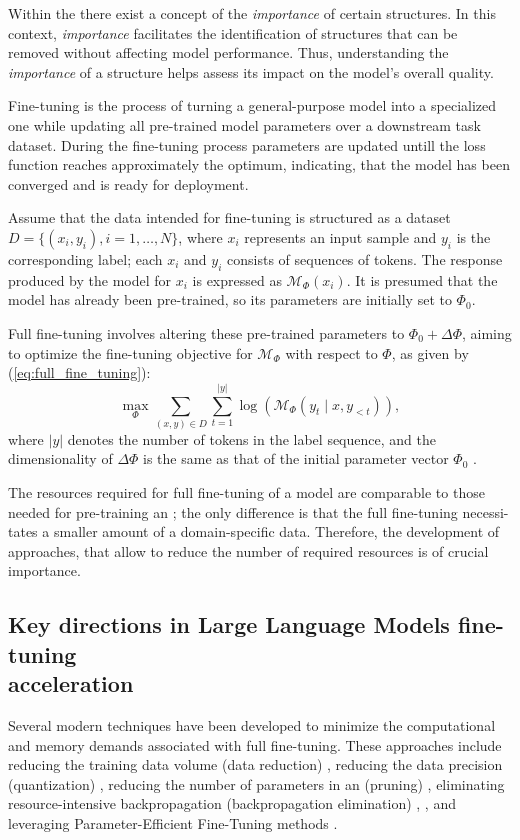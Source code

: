     Within the \llm{} there exist a concept of the  \textit{importance} of certain structures. In this context, \textit{importance} facilitates the identification of structures that can be removed without affecting model performance. Thus, understanding the \textit{importance} of a structure helps assess its impact on the model's overall quality.

    Fine-tuning is the process of turning a general-purpose model into a specialized one while updating all pre-trained model parameters over a downstream task dataset. During the fine-tuning process \llm{} parameters are updated untill the loss function reaches approximately the optimum, indicating, that the model has been converged \cite{allenzhu2019convergencetheorydeeplearning} and is ready for deployment. 

    Assume that the data intended for fine-tuning is structured as a dataset $D = \{(x_i, y_i), i = 1, \ldots, N\}$, where $x_i$ represents an input sample and $y_i$ is the corresponding label; each $x_i$ and $y_i$ consists of sequences of tokens. The response produced by the model for $x_i$ is expressed as $\mathcal{M}_\Phi(x_i)$. It is presumed that the model has already been pre-trained, so its parameters are initially set to $\Phi_0$.

    Full fine-tuning involves altering these pre-trained parameters to $\Phi_0 + \Delta \Phi$, aiming to optimize the fine-tuning objective for $\mathcal{M}_\Phi$ with respect to $\Phi$, as given by (\ref{eq:full_fine_tuning}):
    \begin{equation}
        \label{eq:full_fine_tuning}
        \max_{\Phi} \sum_{(x, y) \in D} \sum_{t = 1}^{|y|} \log\left(\mathcal{M}_\Phi(y_t \mid x, y_{<t})\right),
    \end{equation}
    where $|y|$ denotes the number of tokens in the label sequence, and the dimensionality of $\Delta \Phi$ is the same as that of the initial parameter vector $\Phi_0$ \cite{lora}.
    
    The resources required for full fine-tuning of a model are comparable to those needed for pre-training an \llm{}; the only difference is that the full fine-tuning necessi-tates a smaller amount of a domain-specific data. Therefore, the development of approaches, that allow to reduce the number of required resources is of crucial importance. 
\subsection{Key directions in Large Language Models fine-tuning \\ acceleration}
    Several modern techniques have been developed to minimize the computational and memory demands associated with full fine-tuning. These approaches include reducing the training data volume (data reduction) \cite{aloe}, reducing the data precision (quantization) \cite{qlora}, reducing the number of parameters in an \llm{} (pruning) \cite{model_pruning}, eliminating resource-intensive backpropagation (backpropagation elimination) \cite{mezo}, \cite{hinton2022forwardforwardalgorithmpreliminaryinvestigations}, and leveraging Parameter-Efficient Fine-Tuning methods \cite{lora}.

